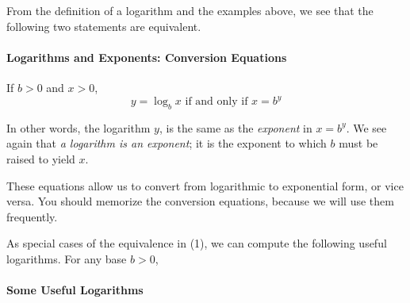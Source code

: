 \documentclass[10pt,]{book}
\theoremstyle{plain}
\theoremstyle{definition}
\theoremstyle{definition}
\theoremstyle{definition}
\theoremstyle{definition}
\theoremstyle{definition}
\numberwithin{equation}{section}
\newcommand{\gt}{ > }
\begin{document}
	From the definition of a logarithm and the examples above, we see that the following two statements are equivalent.
%
\typeout{************************************************}
\typeout{************************************************}
\paragraph[Logarithms and Exponents: Conversion Equations]{Logarithms and Exponents: Conversion Equations}\label{paragraphs-62}

	If \(b \gt 0\) and \(x \gt 0\),
	\begin{equation*}y = \log_b x \text{ if and only if } x = b^y\end{equation*}
%
\par

	In other words, the logarithm \(y\), is the same as the \emph{exponent} in \(x = b^y\). We see again that \emph{a logarithm is an exponent}; it is the exponent to which \(b\) must be raised to yield \(x\).
%
\par

	These equations allow us to convert from logarithmic to exponential form, or vice versa. You should memorize the conversion equations, because we will use them frequently. 
%
\par

	As special cases of the equivalence in (1), we can compute the following useful logarithms.
For any base \(b \gt 0\),
%
\typeout{************************************************}
\typeout{************************************************}
\paragraph[Some Useful Logarithms]{Some Useful Logarithms}\label{paragraphs-63}
\end{document}
